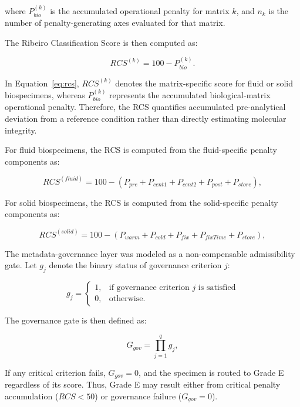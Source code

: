 \documentclass[preprint,12pt]{elsarticle}
\begin{document}
where \(P_{bio}^{(k)}\) is the accumulated operational penalty for matrix \(k\), and \(n_k\) is the number of penalty-generating 
axes evaluated for that matrix.

The Ribeiro Classification Score is then computed as:

\begin{equation}
RCS^{(k)} = 100 - P_{bio}^{(k)}.
\label{eq:rcs}
\end{equation}

In Equation~\ref{eq:rcs}, \(RCS^{(k)}\) denotes the matrix-specific score for fluid or solid biospecimens, whereas \(P_{bio}^{(k)}\) 
represents the accumulated biological-matrix operational penalty. Therefore, the RCS quantifies accumulated pre-analytical deviation 
from a reference condition rather than directly estimating molecular integrity.

For fluid biospecimens, the RCS is computed from the fluid-specific penalty components as:

\begin{equation}
RCS^{(fluid)} = 100 - (P_{pre}+P_{cent1}+P_{cent2}+P_{post}+P_{store}),
\label{eq:rcs_fluid}
\end{equation}

For solid biospecimens, the RCS is computed from the solid-specific penalty components as:

\begin{equation}
RCS^{(solid)} = 100 - (P_{warm}+P_{cold}+P_{fix}+P_{fixTime}+P_{store}),
\label{eq:rcs_solid}
\end{equation}

The metadata-governance layer was modeled as a non-compensable admissibility gate. Let \(g_j\) denote the binary status of 
governance criterion \(j\):

\begin{equation}
g_j =
\begin{cases}
1, & \text{if governance criterion } j \text{ is satisfied} \\
0, & \text{otherwise}.
\end{cases}
\label{eq:governance_criterion}
\end{equation}

The governance gate is then defined as:

\begin{equation}
G_{gov} = \prod_{j=1}^{q} g_j,
\label{eq:governance_product}
\end{equation}

If any critical criterion fails, \(G_{gov}=0\), and the specimen is routed to Grade E regardless of its score. Thus, Grade E may 
result either from critical penalty accumulation (\(RCS<50\)) or governance failure (\(G_{gov}=0\)).
\end{document}
